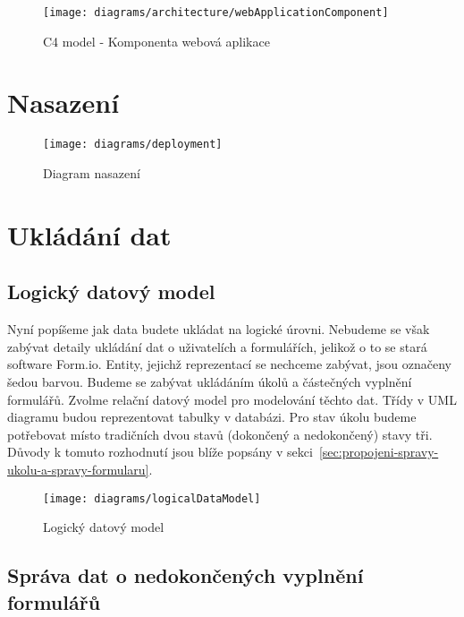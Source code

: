 \begin{figure}[H]
    \texttt{[image: diagrams/architecture/webApplicationComponent]}
    \caption{C4 model - Komponenta webová aplikace}\label{fig:architecture-component-web-application}
\end{figure}


\section{Nasazení}\label{sec:deployment}

\begin{figure}[H]
    \texttt{[image: diagrams/deployment]}
    \caption{Diagram nasazení}\label{fig:deployment}
\end{figure}


\section{Ukládání dat}\label{sec:ukladani-dat}

\subsection{Logický datový model}\label{subsec:logicky-datovy-model}

Nyní popíšeme jak data budete ukládat na logické úrovni.
Nebudeme se však zabývat detaily ukládání dat o uživatelích a formulářích, jelikož o to se stará software Form.io.
Entity, jejichž reprezentací se nechceme zabývat, jsou označeny šedou barvou.
Budeme se zabývat ukládáním úkolů a částečných vyplnění formulářů.
Zvolme relační datový model pro modelování těchto dat.
Třídy v UML diagramu budou reprezentovat tabulky v databázi.
Pro stav úkolu budeme potřebovat místo tradičních dvou stavů (dokončený a nedokončený) stavy tři.
Důvody k tomuto rozhodnutí jsou blíže popsány v sekci\ \ref{sec:propojeni-spravy-ukolu-a-spravy-formularu}.

\begin{figure}[H]
    \texttt{[image: diagrams/logicalDataModel]}
    \caption{Logický datový model}\label{fig:logical-data-model}
\end{figure}

\subsection{Správa dat o nedokončených vyplnění formulářů}\label{subsec:sprava-dat-o-nedokoncenych-vyplneni-formularu}

